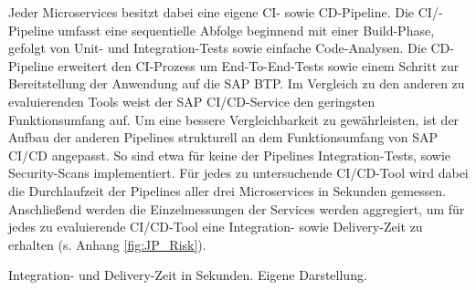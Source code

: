 \vspace*{-15mm}
Jeder Microservices besitzt dabei eine eigene CI- sowie CD-Pipeline. Die CI/-Pipeline umfasst eine sequentielle Abfolge beginnend mit einer Build-Phase, gefolgt von Unit- und Integration-Tests sowie einfache Code-Analysen. Die CD-Pipeline erweitert den CI-Prozess um End-To-End-Tests sowie einem Schritt zur Bereitstellung der Anwendung auf die SAP BTP. Im Vergleich zu den anderen zu evaluierenden Tools weist der SAP CI/CD-Service den geringsten Funktionsumfang auf. Um eine bessere Vergleichbarkeit zu gewährleisten, ist der Aufbau der anderen Pipelines strukturell an dem Funktionsumfang von SAP CI/CD angepasst. So sind etwa für keine der Pipelines Integration-Tests, sowie Security-Scans implementiert. Für jedes zu untersuchende CI/CD-Tool wird dabei die Durchlaufzeit der Pipelines aller drei Microservices in Sekunden gemessen. Anschließend werden die Einzelmessungen der Services werden aggregiert, um für jedes zu evaluierende CI/CD-Tool eine  Integration- sowie Delivery-Zeit zu erhalten (s. Anhang \ref{fig:JP_Risk}).
\begin{center}
	\begin{table}[H]
		\centering
		\caption[Integration- und Delivery-Zeit in Sekunden]{Integration- und Delivery-Zeit in Sekunden. Eigene Darstellung.}
		\label{tab:Performance}
	\end{table}
\end{center}
\vspace*{-15mm}
